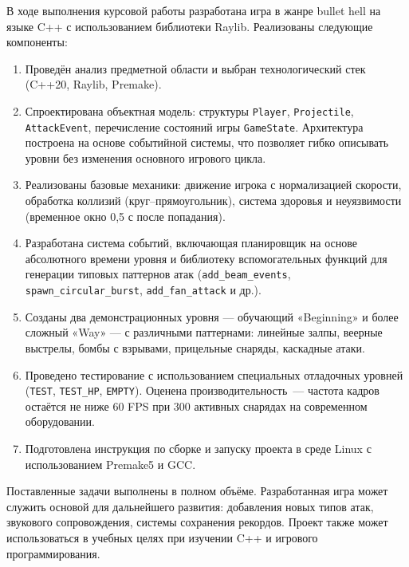 \documentclass[../main.tex]{subfiles}
\begin{document}
В ходе выполнения курсовой работы разработана игра в жанре bullet hell на языке C++ с использованием библиотеки Raylib. Реализованы следующие компоненты:

\begin{enumerate}
	\item Проведён анализ предметной области и выбран технологический стек (C++20, Raylib, Premake).
	\item Спроектирована объектная модель: структуры \texttt{Player}, \texttt{Projectile}, \texttt{AttackEvent}, перечисление состояний игры \texttt{GameState}. Архитектура построена на основе событийной системы, что позволяет гибко описывать уровни без изменения основного игрового цикла.
	\item Реализованы базовые механики: движение игрока с нормализацией скорости, обработка коллизий (круг–прямоугольник), система здоровья и неуязвимости (временное окно 0,5 с после попадания).
	\item Разработана система событий, включающая планировщик на основе абсолютного времени уровня и библиотеку вспомогательных функций для генерации типовых паттернов атак (\texttt{add\_beam\_events}, \texttt{spawn\_circular\_burst}, \texttt{add\_fan\_attack} и др.).
	\item Созданы два демонстрационных уровня — обучающий «Beginning» и более сложный «Way» — с различными паттернами: линейные залпы, веерные выстрелы, бомбы с взрывами, прицельные снаряды, каскадные атаки.
	\item Проведено тестирование с использованием специальных отладочных уровней (\texttt{TEST}, \texttt{TEST\_HP}, \texttt{EMPTY}).
	Оценена производительность~— частота кадров остаётся не ниже 60 FPS при 300 активных снарядах на современном оборудовании.
	\item Подготовлена инструкция по сборке и запуску проекта в среде Linux с использованием Premake5 и GCC.
\end{enumerate}

Поставленные задачи выполнены в полном объёме. Разработанная игра может служить основой для дальнейшего развития: добавления новых типов атак, звукового сопровождения, системы сохранения рекордов. Проект также может использоваться в учебных целях при изучении C++ и игрового программирования.
\end{document}
